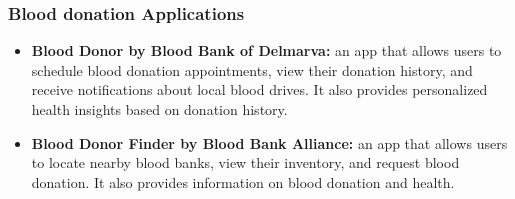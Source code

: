 \subsubsection{Blood donation Applications}
\begin{itemize}
\item \textbf{Blood Donor by Blood Bank of Delmarva:} an app that allows users to schedule blood donation appointments, view their donation history, and receive notifications about local blood drives. It also provides personalized health insights based on donation history. 
\item \textbf{Blood Donor Finder by Blood Bank Alliance:}  an app that allows users to locate nearby blood banks, view their inventory, and request blood donation. It also provides information on blood donation and health.\cite{bloodbankalliance}
\end{itemize}
